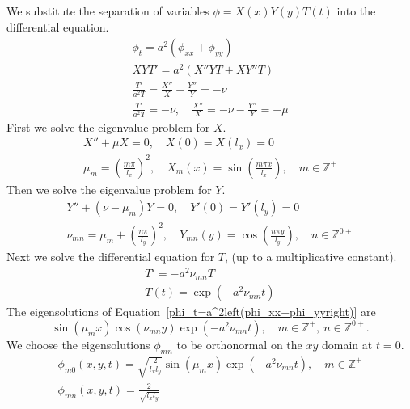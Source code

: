 {%
\begin{Solution}
  \label{solution separation pt=a2pxx+pyy}
  We substitute the separation of variables $\phi = X(x) Y(y) T(t)$
  into the differential equation.
  \begin{gather}
    \label{phi_t=a^2left(phi_xx+phi_yyright)}
    \phi_t = a^2 \left( \phi_{x x} + \phi_{y y} \right) \\
    \nonumber
    X Y T' = a^2 \left( X'' Y T + X Y'' T \right) \\
    \nonumber
    \frac{ T' }{ a^2 T } = \frac{ X'' }{ X } + \frac{ Y'' }{ Y } = - \nu\\
    \nonumber
    \frac{ T' }{ a^2 T } = - \nu, \quad
    \frac{ X'' }{ X } = - \nu - \frac{ Y'' }{ Y } = - \mu
  \end{gather}
  First we solve the eigenvalue problem for $X$.
  \begin{gather*}
    X'' + \mu X = 0, \quad X(0) = X(l_x) = 0 \\
    \mu_m = \left( \frac{ m \pi }{ l_x } \right)^2, \quad
    X_m(x) = \sin \left( \frac{ m \pi x }{ l_x } \right), \quad
    m \in \mathbb{Z}^+
  \end{gather*}
  Then we solve the eigenvalue problem for $Y$.
  \begin{gather*}
    Y'' + (\nu - \mu_m) Y = 0, \quad Y'(0) = Y'(l_y) = 0 \\
    \nu_{m n} = \mu_m + \left( \frac{ n \pi }{ l_y } \right)^2, \quad
    Y_{m n}(y) = \cos \left( \frac{ n \pi y }{ l_y } \right), \quad
    n \in \mathbb{Z}^{0+}
  \end{gather*}
  Next we solve the differential equation for $T$, (up to a
  multiplicative constant).
  \begin{gather*}
    T' = - a^2 \nu_{m n} T \\
    T(t) = \exp \left( - a^2 \nu_{m n} t \right)
  \end{gather*}
  The eigensolutions of Equation~\ref{phi_t=a^2left(phi_xx+phi_yyright)}
  are
  \[
  \sin(\mu_m x) \cos(\nu_{m n} y) \exp \left( - a^2 \nu_{m n} t \right),
  \quad m \in \mathbb{Z}^+,\ n \in \mathbb{Z}^{0+}.
  \]
  We choose the eigensolutions $\phi_{m n}$ to be orthonormal on
  the $xy$ domain at $t = 0$.
  \begin{gather*}
    \phi_{m 0}(x,y,t) = \sqrt{ \frac{ 2 }{ l_x l_y } }
    \sin(\mu_m x) \exp \left( - a^2 \nu_{m n} t \right),
    \quad m \in \mathbb{Z}^+ \\
    \phi_{m n}(x,y,t) = \frac{ 2 }{ \sqrt{ l_x l_y } }

\end{gather*}
\end{Solution}}
